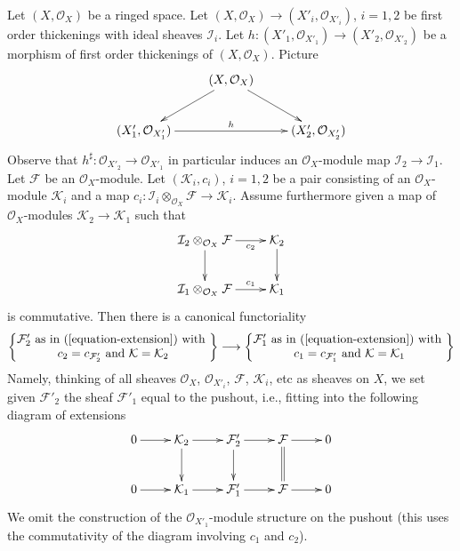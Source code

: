 \begin{remark}
\label{remark-extension-functorial}
Let $(X, \mathcal{O}_X)$ be a ringed space. Let
$(X, \mathcal{O}_X) \to (X'_i, \mathcal{O}_{X'_i})$, $i = 1, 2$
be first order thickenings with ideal sheaves $\mathcal{I}_i$.
Let $h : (X'_1, \mathcal{O}_{X'_1}) \to (X'_2, \mathcal{O}_{X'_2})$
be a morphism of first order thickenings of $(X, \mathcal{O}_X)$.
Picture
$$
\xymatrix{
& (X, \mathcal{O}_X) \ar[ld] \ar[rd] & \\
(X'_1, \mathcal{O}_{X'_1}) \ar[rr]^h & & 
(X'_2, \mathcal{O}_{X'_2})
}
$$
Observe that $h^\sharp : \mathcal{O}_{X'_2} \to \mathcal{O}_{X'_1}$
in particular induces an $\mathcal{O}_X$-module map
$\mathcal{I}_2 \to \mathcal{I}_1$.
Let $\mathcal{F}$ be an
$\mathcal{O}_X$-module. Let $(\mathcal{K}_i, c_i)$, $i = 1, 2$ be a pair
consisting of an $\mathcal{O}_X$-module $\mathcal{K}_i$ and a map
$c_i : \mathcal{I}_i \otimes_{\mathcal{O}_X} \mathcal{F} \to
\mathcal{K}_i$. Assume furthermore given a map
of $\mathcal{O}_X$-modules $\mathcal{K}_2 \to \mathcal{K}_1$
such that
$$
\xymatrix{
\mathcal{I}_2 \otimes_{\mathcal{O}_X} \mathcal{F}
\ar[r]_-{c_2} \ar[d] &
\mathcal{K}_2 \ar[d] \\
\mathcal{I}_1 \otimes_{\mathcal{O}_X} \mathcal{F}
\ar[r]^-{c_1} &
\mathcal{K}_1
}
$$
is commutative. Then there is a canonical functoriality
$$
\left\{
\begin{matrix}
\mathcal{F}'_2\text{ as in (\ref{equation-extension}) with }\\
c_2 = c_{\mathcal{F}'_2}\text{ and }\mathcal{K} = \mathcal{K}_2
\end{matrix}
\right\}
\longrightarrow
\left\{
\begin{matrix}
\mathcal{F}'_1\text{ as in (\ref{equation-extension}) with }\\
c_1 = c_{\mathcal{F}'_1}\text{ and }\mathcal{K} = \mathcal{K}_1
\end{matrix}
\right\}
$$
Namely, thinking of all sheaves $\mathcal{O}_X$, $\mathcal{O}_{X'_i}$,
$\mathcal{F}$, $\mathcal{K}_i$, etc as sheaves on $X$, we set
given $\mathcal{F}'_2$ the sheaf $\mathcal{F}'_1$ equal to the
pushout, i.e., fitting into the following diagram of extensions
$$
\xymatrix{
0 \ar[r] &
\mathcal{K}_2 \ar[r] \ar[d] &
\mathcal{F}'_2 \ar[r] \ar[d] &
\mathcal{F} \ar@{=}[d] \ar[r] & 0 \\
0 \ar[r] &
\mathcal{K}_1 \ar[r] &
\mathcal{F}'_1 \ar[r] &
\mathcal{F} \ar[r] & 0
}
$$
We omit the construction of the $\mathcal{O}_{X'_1}$-module structure
on the pushout (this uses the commutativity of the diagram
involving $c_1$ and $c_2$).
\end{remark}

